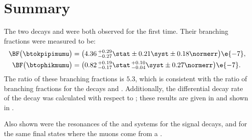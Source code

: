 \section{Summary}
\label{sec:hhh:conc}

The two \fcnc decays \btokpipimumu and \btophikmumu were both observed for the first time.
Their branching fractions were measured to be:
\begin{align*}
  \BF\big( \btokpipimumu \big)&=
  \big(4.36\,^{+0.29}_{-0.27}\stat\pm0.21\syst\pm0.18\normerr\big)\e{-7}, \\
  \BF\big(\btophikmumu\big)&=
  \big(0.82\,^{+0.19}_{-0.17}\stat\,^{+0.10}_{-0.04}\syst\pm0.27\normerr\big)\e{-7}.
\end{align*}
The ratio of these branching fractions is \approx$5.3$, which is consistent with the ratio of
branching fractions for the decays \decay{\Bp}{\kpipi} and \decay{\Bp}{\phik}.
Additionally, the differential decay rate of the decay \btokpipimumu was calculated with respect to
\qsq; these results are given in  and shown in .

Also shown were the resonances of the \kpipi and \phik systems for the signal decays, and for the
same final states where the muons come from a \jpsi.


%
%
%


